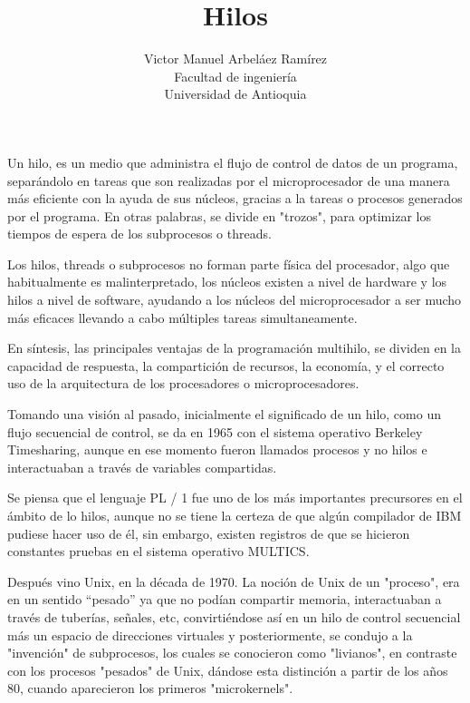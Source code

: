 \documentclass[12pt, letter]{article}
\title{\huge{Hilos}}
\author{Victor Manuel Arbeláez Ramírez \\ Facultad de ingeniería \\ Universidad de Antioquia}
\date{}
\begin{document}
\raggedright

\maketitle

\setlength{\parindent}{31pt}
Un hilo, es un medio que administra el flujo de control de datos de un programa, separándolo en tareas que son realizadas por el microprocesador de una manera más eficiente con la ayuda de sus núcleos, gracias a la tareas o procesos generados por el programa. En otras palabras, se divide en "trozos", para optimizar los tiempos de espera de los subprocesos o threads.

\setlength{\parindent}{31pt}
Los hilos, threads o subprocesos no forman parte física del procesador, algo que habitualmente es malinterpretado, los núcleos existen a nivel de hardware y los hilos a nivel de software, ayudando a los núcleos del microprocesador a ser mucho más eficaces llevando a cabo múltiples tareas simultaneamente.

\setlength{\parindent}{31pt}
En síntesis, las principales ventajas de la programación multihilo, se dividen en la capacidad de respuesta, la compartición de recursos, la economía, y el correcto uso de la arquitectura de los procesadores o microprocesadores.

%
\setlength{\parindent}{31pt}
Tomando una visión al pasado, inicialmente el significado de un hilo, como un flujo secuencial de control, se da en 1965 con el sistema operativo Berkeley Timesharing, aunque en ese momento fueron llamados procesos y no hilos e interactuaban a través de variables compartidas.

\setlength{\parindent}{31pt}
Se piensa que el lenguaje PL / 1  fue uno de los más importantes precursores en el ámbito de lo hilos, aunque no se tiene la certeza de que algún compilador de IBM pudiese hacer uso de él, sin embargo, existen registros de que se hicieron constantes pruebas en el sistema operativo MULTICS.

\setlength{\parindent}{31pt}
Después vino Unix, en la década de 1970. La noción de Unix de un "proceso", era en un sentido “pesado” ya que no podían compartir memoria, interactuaban a través de tuberías, señales, etc, convirtiéndose así en un hilo de control secuencial más un espacio de direcciones virtuales y posteriormente, se condujo a la "invención" de subprocesos, los cuales se conocieron como "livianos", en contraste con los procesos "pesados" de Unix, dándose esta distinción a partir de los años 80, cuando aparecieron los primeros "microkernels".
\end{document}
